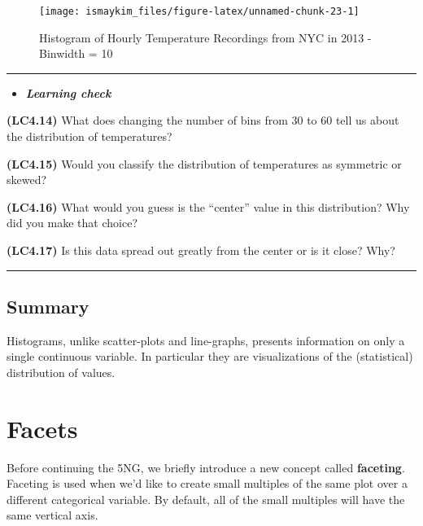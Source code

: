 \documentclass[]{tufte-book}
\let\oldrule=\rule
\renewcommand{\rule}[1]{\oldrule{\linewidth}}
\newenvironment{rmdblock}[1]
  {\begin{shaded*}
  \begin{itemize}
  \renewcommand{\labelitemi}{
    \raisebox{-.7\height}[0pt][0pt]{
    }
  }
  \item
  }
  {
  \end{itemize}
  \end{shaded*}
  }
\newenvironment{learncheck}
  {\begin{rmdblock}{warning}}
  {\end{rmdblock}}
\theoremstyle{definition}
\theoremstyle{definition}
\theoremstyle{remark}
\begin{document}
\begin{figure}

{\centering \texttt{[image: ismaykim\_files/figure-latex/unnamed-chunk-23-1]} 

}

\caption[Histogram of Hourly Temperature Recordings from NYC in 2013 - Binwidth = 10]{Histogram of Hourly Temperature Recordings from NYC in 2013 - Binwidth = 10}\label{fig:unnamed-chunk-23}
\end{figure}

\begin{center}\rule{0.5\linewidth}{\linethickness}\end{center}

\begin{learncheck}
\textbf{\emph{Learning check}}
\end{learncheck}

\textbf{(LC4.14)} What does changing the number of bins from 30 to 60
tell us about the distribution of temperatures?

\textbf{(LC4.15)} Would you classify the distribution of temperatures as
symmetric or skewed?

\textbf{(LC4.16)} What would you guess is the ``center'' value in this
distribution? Why did you make that choice?

\textbf{(LC4.17)} Is this data spread out greatly from the center or is
it close? Why?

\begin{center}\rule{0.5\linewidth}{\linethickness}\end{center}

\subsection{Summary}\label{summary-2}

Histograms, unlike scatter-plots and line-graphs, presents information
on only a single continuous variable. In particular they are
visualizations of the (statistical) distribution of values.

\section{Facets}\label{facets}

Before continuing the 5NG, we briefly introduce a new concept called
\textbf{faceting}. Faceting is used when we'd like to create small
multiples of the same plot over a different categorical variable. By
default, all of the small multiples will have the same vertical axis.
\end{document}
